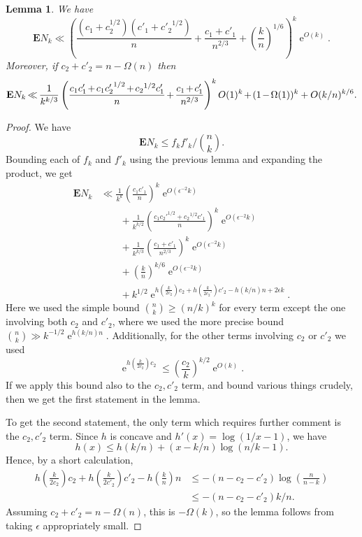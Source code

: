 \documentclass[10pt,a4paper]{amsart}
\newtheorem{lemma}[theorem]{Lemma}
\theoremstyle{remark}
\DeclareMathOperator{\expe}{e}
\newcommand{\eps}{\epsilon}
\newcommand\E{\mathbf{E}}
\newcommand\br[1]{\left({#1}\right)}
\newcommand\pfrac[2]{\br{\frac{#1}{#2}}}
\newcommand*{\Mk}{\mkern -2mu}
\begin{document}
\begin{lemma} \label{lem:Nk-bound-small-k}
We have
\[
 \E N_k \ll \left(
 \frac{(c_1 + c_2^{1/2}) (c'_1 + {c'_2}^{1/2})}{n} + \frac{c_1 + c'_1}{n^{2/3}} + \pfrac{k}{n}^{1/6}
 \right)^k \expe^{O(k)}.
\]
Moreover, if $c_2 + c'_2 = n - \Omega(n)$ then
\begin{align*}
 \E N_k
 \Mk \ll \Mk \frac1{k^{k/3}}
 \left(
 \frac{ c_1 c'_1 \Mk +\Mk c_1 {c'_2}^{1/2} \Mk +\Mk {c_2}^{1/2} c'_1}{n} \Mk +\Mk \frac{c_1 \Mk +\Mk c'_1}{n^{2/3}}
 \right)^k O(1)^k %
 \Mk +\Mk (1 \Mk -\Mk \Omega(1))^k + O(k/n)^{k/6}.
\end{align*}
\end{lemma}
\begin{proof}
We have
\[
 \E N_k \leq f_k f'_k / \binom{n}{k}.
\]
Bounding each of $f_k$ and $f'_k$ using the previous lemma and expanding the product, we get
\begin{align*}
 \E N_k 
 &\ll \frac1{k^k} \pfrac{c_1 c'_1}{n}^k \expe^{O(\eps^{-2} k)} \\
 &\qquad + \frac1{k^{k/2}} \pfrac{c_1 {c_2'}^{1/2} + {c_2}^{1/2} c'_1}{n}^k \expe^{O(\eps^{-2} k)} \\
 &\qquad + \frac1{k^{k/3}} \left(\frac{c_1 + c'_1}{n^{2/3}} \right)^k \expe^{O(\eps^{-2} k)} \\
 &\qquad + \left(\frac{k}{n} \right)^{k/6} \expe^{O(\eps^{-2} k)} \\
 &\qquad + k^{1/2} \expe^{h\left(\frac{k}{2c_2}\right) c_2 + h\left(\frac{k}{2c_2'}\right)c'_2 - h(k/n)n + 2 \eps k}.
\end{align*}
Here we used the simple bound $\binom{n}{k} \geq (n/k)^k$ for every term except the one involving both $c_2$ and $c'_2$, where we used the more precise bound $\binom{n}{k} \gg k^{-1/2} \expe^{h(k/n) n}$. Additionally, for the other terms involving $c_2$ or $c'_2$ we used
\[
 \expe^{h\pfrac{k}{2c_2}c_2} \leq \pfrac{c_2}{k}^{k/2} \expe^{O(k)}.
\]
If we apply this bound also to the $c_2, c'_2$ term, and bound various things crudely, then we get the first statement in the lemma.

To get the second statement, the only term which requires further comment is the $c_2, c'_2$ term. Since $h$ is concave and $h'(x) = \log(1/x - 1)$, we have
\[
 h(x) \leq h(k/n) + (x - k/n) \log(n/k - 1).
\]
Hence, by a short calculation,
\begin{align*}
 h\pfrac{k}{2c_2} c_2 + h\pfrac{k}{2c'_2} c'_2 - h\pfrac{k}{n} n
 &\leq -(n - c_2 - c'_2) \log \pfrac{n}{n-k} \\
 &\leq -(n - c_2 - c'_2) k/n.
\end{align*}
Assuming $c_2 + c'_2 = n - \Omega(n)$, this is $-\Omega(k)$, so the lemma follows from taking $\eps$ appropriately small.
\end{proof}
\end{document}
